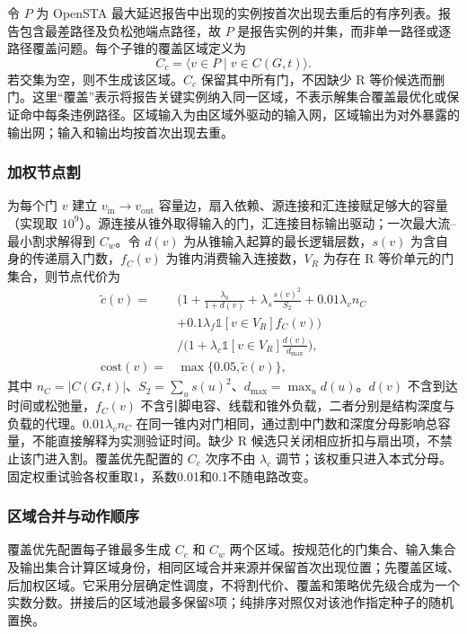 \documentclass[twocolumn,10pt,fontset=windows]{ctexart}
\begin{document}
令 $P$ 为 OpenSTA 最大延迟报告中出现的实例按首次出现去重后的有序列表。报告包含最差路径及负松弛端点路径，故 $P$ 是报告实例的并集，而非单一路径或逐路径覆盖问题。每个子锥的覆盖区域定义为
\begin{equation}\label{eq:cover_region}
C_c=\langle v\in P\mid v\in C(G,t)\rangle.
\end{equation}
若交集为空，则不生成该区域。$C_c$ 保留其中所有门，不因缺少 R 等价候选而删门。这里“覆盖”表示将报告关键实例纳入同一区域，不表示解集合覆盖最优化或保证命中每条违例路径。区域输入为由区域外驱动的输入网，区域输出为对外暴露的输出网；输入和输出均按首次出现去重。

\subsubsection{加权节点割}
为每个门 $v$ 建立 $v_{\mathrm{in}}\!\to v_{\mathrm{out}}$ 容量边，扇入依赖、源连接和汇连接赋足够大的容量（实现取 $10^9$）。源连接从锥外取得输入的门，汇连接目标输出驱动；一次最大流--最小割求解得到 $C_w$。令 $d(v)$ 为从锥输入起算的最长逻辑层数，$s(v)$ 为含自身的传递扇入门数，$f_C(v)$ 为锥内消费输入连接数，$V_R$ 为存在 R 等价单元的门集合，则节点代价为
{\small
\begin{equation}\label{eq:cost}
\begin{aligned}
\widetilde c(v)={}&\Big(1+\frac{\lambda_b}{1+d(v)}
+\lambda_s\frac{s(v)^2}{S_2}+0.01\lambda_v n_C\\
&+0.1\lambda_f\mathbb{1}[v\in V_R]f_C(v)\Big)\\
&\Big/\Big(1+\lambda_c\mathbb{1}[v\in V_R]\frac{d(v)}{d_{\max}}\Big),\\
\mathrm{cost}(v)={}&\max\{0.05,\widetilde c(v)\},
\end{aligned}
\end{equation}
}
其中 $n_C=|C(G,t)|$、$S_2=\sum_u s(u)^2$、$d_{\max}=\max_u d(u)$。$d(v)$ 不含到达时间或松弛量，$f_C(v)$ 不含引脚电容、线载和锥外负载，二者分别是结构深度与负载的代理。$0.01\lambda_v n_C$ 在同一锥内对门相同，通过割中门数和深度分母影响总容量，不能直接解释为实测验证时间。缺少 R 候选只关闭相应折扣与扇出项，不禁止该门进入割。覆盖优先配置的 $C_c$ 次序不由 $\lambda_c$ 调节；该权重只进入本式分母。固定权重试验各权重取1，系数0.01和0.1不随电路改变。

\subsubsection{区域合并与动作顺序}
覆盖优先配置每子锥最多生成 $C_c$ 和 $C_w$ 两个区域。按规范化的门集合、输入集合及输出集合计算区域身份，相同区域合并来源并保留首次出现位置；先覆盖区域、后加权区域。它采用分层确定性调度，不将割代价、覆盖和策略优先级合成为一个实数分数。拼接后的区域池最多保留8项；纯排序对照仅对该池作指定种子的随机置换。
\end{document}
